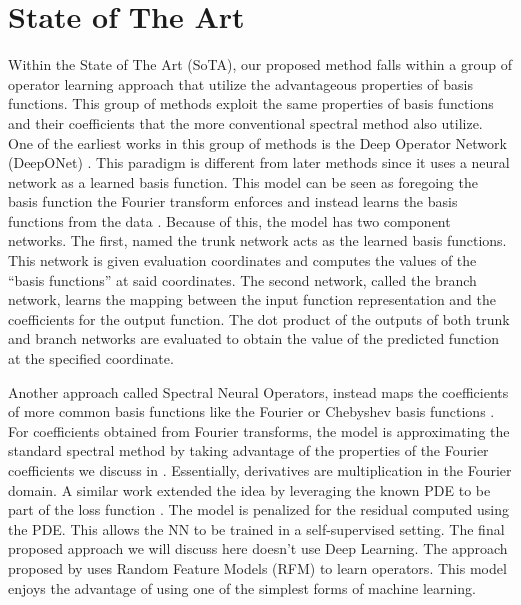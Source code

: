 \section{State of The Art}
\noindent Within the State of The Art (SoTA), our proposed method falls within a group of operator learning approach that utilize the advantageous properties of basis functions. This group of methods exploit the same properties of basis functions and their coefficients that the more conventional spectral method also utilize. One of the earliest works in this group of methods is the Deep Operator Network (DeepONet) \textcite{luLearningNonlinearOperators2021}. This paradigm is different from later methods since it uses a neural network as a learned basis function. This model can be seen as foregoing the basis function the Fourier transform enforces and instead learns the basis functions from the data \autocite{meurisMachinelearningbasedSpectralMethods2023}. Because of this, the model has two component networks. The first, named the trunk network acts as the learned basis functions. This network is given evaluation coordinates and computes the values of the \enquote{basis functions} at said coordinates. The second network, called the branch network, learns the mapping between the input function representation and the coefficients for the output function. The dot product of the outputs of both trunk and branch networks are evaluated to obtain the value of the predicted function at the specified coordinate.

Another approach called Spectral Neural Operators, instead maps the coefficients of more common basis functions like the Fourier or Chebyshev basis functions \autocite{fanaskovSpectralNeuralOperators2023}. For coefficients obtained from Fourier transforms, the model is approximating the standard spectral method by taking advantage of the properties of the Fourier coefficients we discuss in . Essentially, derivatives are multiplication in the Fourier domain. A similar work extended the idea by leveraging the known PDE to be part of the loss function \autocite{du2024neural}. The model is penalized for the residual computed using the PDE\@. This allows the NN to be trained in a self-supervised setting. The final proposed approach we will discuss here doesn't use Deep Learning. The approach proposed by \textcite{nelsenOperatorLearningUsing2024} uses Random Feature Models (RFM) to learn operators. This model enjoys the advantage of using one of the simplest forms of machine learning.

